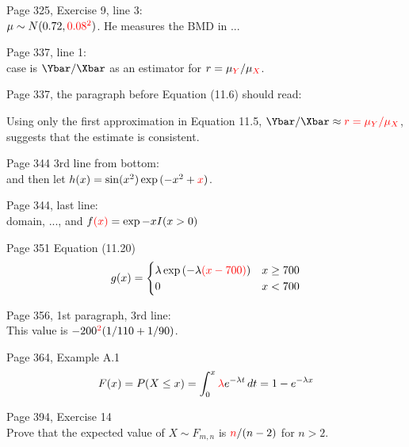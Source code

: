 \documentclass[11pt]{article}
\begin{document}
\bigskip
Page 325, Exercise 9, line 3: \\
$\mu \sim N(0.72, \textcolor{red}{0.08^2})$. He measures the BMD in ...



\bigskip
Page 337, line 1:\\
case is $\Ybar/\Xbar$ as an estimator for  $r = \mu_{\textcolor{red}{Y}} / \mu_{\textcolor{red}{X}}$.

\bigskip
Page 337, the paragraph before Equation (11.6) should read:

Using only the first approximation in Equation 11.5,
$ \Ybar/\Xbar \approx \textcolor{red}{r = \mu_Y/\mu_X}$, %
suggests that the estimate is consistent.

\bigskip
Page 344 3rd line from bottom:\\
and then let $h(x) = \sin(x^2)\exp{(-x^2+\textcolor{red}{x})}$.

\bigskip
Page 344, last line:\\
domain, ..., and $f\textcolor{red}{(x)}=\exp{-x}I(x > 0)$


\bigskip
Page 351 Equation (11.20)
\[
g(x)=\begin{cases} \lambda \exp{(-\lambda{\color{red}{(x-700)}})} & x \ge 700\\
        0 & x < 700
     \end{cases}
\]

\bigskip
Page 356, 1st paragraph, 3rd line:\\
This value is $-200^{\color{red}2}(1/110 + 1/90)$.



\bigskip
Page 364, Example A.1\\
\[
F(x)=P(X\le x) =
\int_0^x {\color{red}{\lambda}} e^{-\lambda t}\, dt = 1-e^{-\lambda x}
\]


\bigskip  %
Page 394, Exercise 14\\
Prove that the expected value of $X \sim F_{m, n}$ is ${\color{red}{n}}/(n-2)$ for $n > 2$.
\end{document}
